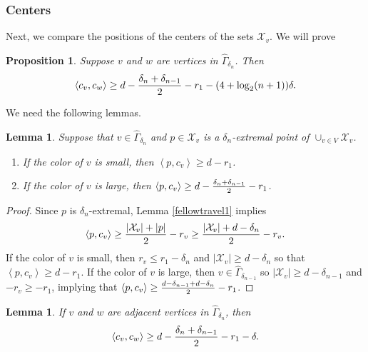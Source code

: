 \documentclass[11pt,letterpaper]{amsart}
\newtheorem{lemma}[theorem]{Lemma}
\newtheorem{proposition}[theorem]{Proposition}
\newtheorem*{remark}{Remark}
\begin{document}
\subsubsection*{Centers}
Next, we compare the positions of the centers of the sets $\mathcal X_v$. We will prove
\begin{proposition}
\label{centergromovproduct}
Suppose $v$ and $w$ are vertices in $\hat \Gamma_{\delta_n}$. Then 
$$
\left<c_v,c_w\right>\geq d-{\delta_n+\delta_{n-1}\over 2}-r_1-(4+\log_2(n+1))\delta.
$$
\end{proposition}
We need the following lemmas. 
\begin{lemma}
\label{largeandsmall}
Suppose that $v\in\hat\Gamma_{\delta_n}$ and $p\in\mathcal X_v$ is a $\delta_n$-extremal point of $\cup_{v\in V}\mathcal X_v$. 
\begin{enumerate}
\item[1.] 
If the color of $v$ is small, then $\left<p,c_v\right>\geq d-r_1$.
\item[2.] 
If the color of $v$ is large, then $\left<p,c_v\right>\geq d-{\delta_n+\delta_{n-1}\over 2}-r_1$.
\end{enumerate}
\end{lemma}
\begin{proof}
Since $p$ is $\delta_n$-extremal, Lemma \ref{fellowtravel1} implies
$$
\left<p,c_v\right>\geq{|\mathcal X_v|+|p|\over 2}-r_v\geq{|\mathcal X_v|+d-\delta_n\over 2}-r_v.
$$
If the color of $v$ is small, then $r_v\leq r_1-\delta_n$ and $|\mathcal X_v|\geq d-\delta_n$ so that $\left<p,c_v\right>\geq d-r_1$. If the color of $v$ is large, then $v\in\hat\Gamma_{\delta_{n-1}}$ so $|\mathcal X_v|\geq d-\delta_{n-1}$ and $-r_v\geq-r_1$, implying that $\left<p,c_v\right>\geq{d-\delta_{n-1}+d-\delta_n\over 2}-r_1$.
\end{proof}
\begin{lemma}
\label{adjacentvertices}
If $v$ and $w$ are adjacent vertices in $\hat\Gamma_{\delta_n}$, then
$$
\left<c_v,c_w\right>\geq d-{\delta_n+\delta_{n-1}\over 2}-r_1-\delta.
$$
\end{lemma}
\end{document}
